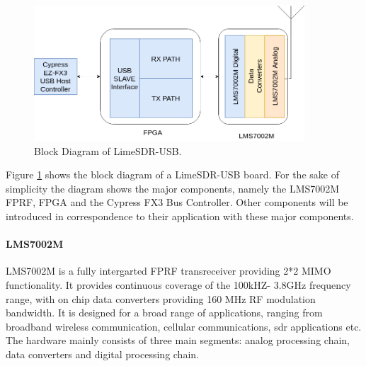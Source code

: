 \begin{figure}[h!]
\centering
\includegraphics[width=0.9\textwidth]{Figure/Lime_Hardware.png}
\caption{Block Diagram of LimeSDR-USB.}
\label{lime_hw_arch}
\end{figure}

Figure \ref{lime_hw_arch} shows the block diagram of a LimeSDR-USB board.
For the sake of simplicity the diagram shows the major components, namely the LMS7002M \ac{FPRF}, \ac{FPGA} and the Cypress FX3 Bus Controller.
Other components will be introduced in correspondence to their application with these major components.

\paragraph{LMS7002M} 

LMS7002M is a fully intergarted \ac{FPRF} transreceiver providing 2*2 \ac{MIMO} functionality.
It provides continuous coverage of the 100kHZ- 3.8GHz frequency range, with on chip data converters providing 160 MHz \ac{RF} modulation bandwidth.
It is designed for a broad range of applications, ranging from broadband wireless communication, cellular communications, \ac{sdr} applications etc.\\
The hardware mainly consists of three main segments: analog processing chain, data converters and digital processing chain.\\

